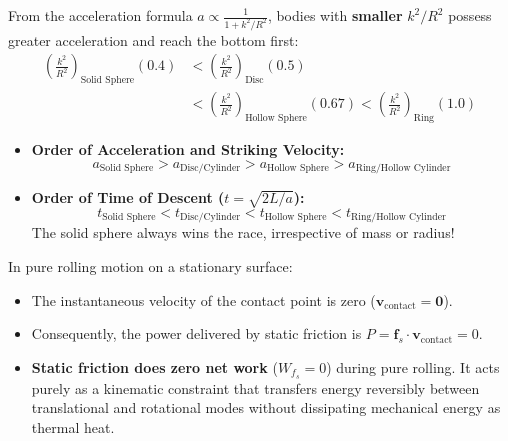 \documentclass[10pt,twoside,openright]{book}
\begin{document}
\begin{usecasebox}
From the acceleration formula $a \propto \frac{1}{1 + k^2/R^2}$, bodies with \textbf{smaller} $k^2/R^2$ possess greater acceleration and reach the bottom first:
\begin{align}
  \left(\frac{k^2}{R^2}\right)_{\text{Solid Sphere}} (0.4) &< \left(\frac{k^2}{R^2}\right)_{\text{Disc}} (0.5) \nonumber \\
  &< \left(\frac{k^2}{R^2}\right)_{\text{Hollow Sphere}} (0.67) < \left(\frac{k^2}{R^2}\right)_{\text{Ring}} (1.0)
\end{align}
\begin{itemize}
  \item \textbf{Order of Acceleration and Striking Velocity:}
  \begin{equation}
    a_{\text{Solid Sphere}} > a_{\text{Disc/Cylinder}} > a_{\text{Hollow Sphere}} > a_{\text{Ring/Hollow Cylinder}}
  \end{equation}
  \item \textbf{Order of Time of Descent ($t = \sqrt{2L/a}$):}
  \begin{equation}
    t_{\text{Solid Sphere}} < t_{\text{Disc/Cylinder}} < t_{\text{Hollow Sphere}} < t_{\text{Ring/Hollow Cylinder}}
  \end{equation}
  The solid sphere always wins the race, irrespective of mass or radius!
\end{itemize}
\end{usecasebox}

\begin{trapbox}
In pure rolling motion on a stationary surface:
\begin{itemize}
  \item The instantaneous velocity of the contact point is zero ($\mathbf{v}_{\text{contact}} = \mathbf{0}$).
  \item Consequently, the power delivered by static friction is $P = \mathbf{f}_s \cdot \mathbf{v}_{\text{contact}} = 0$.
  \item \textbf{Static friction does zero net work} ($W_{f_s} = 0$) during pure rolling. It acts purely as a kinematic constraint that transfers energy reversibly between translational and rotational modes without dissipating mechanical energy as thermal heat.
\end{itemize}
\end{trapbox}

\end{document}
